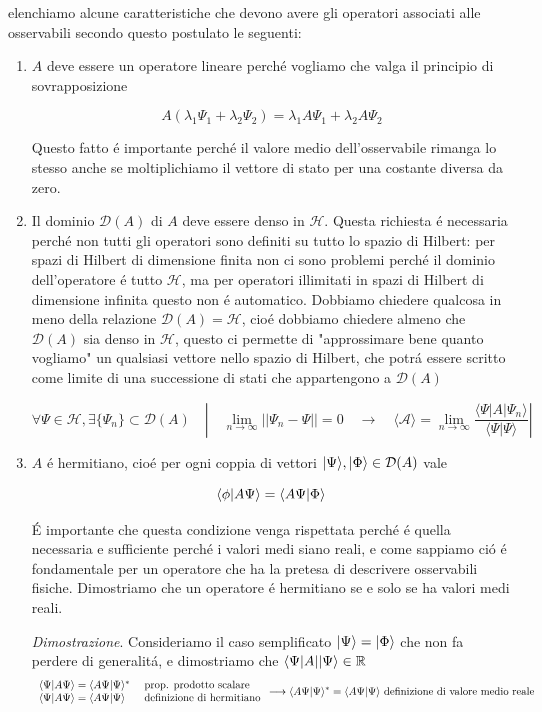 elenchiamo alcune caratteristiche che devono avere gli operatori associati alle osservabili secondo questo postulato le seguenti:
\begin{enumerate}
	\item $A$ deve essere un operatore lineare perch\'e vogliamo che valga il principio di sovrapposizione
	
	$$A(\lambda_{1}\Psi_{1}+\lambda_{2}\Psi_{2})=\lambda_{1}A\Psi_{1}+\lambda_{2}A\Psi_{2}$$
	
	Questo fatto \'e importante perch\'e il valore medio dell'osservabile rimanga lo stesso anche se moltiplichiamo il vettore di stato per una costante diversa da zero.
	
	\item Il dominio $\mathcal{D}(A)$ di $A$ deve essere denso in $\mathcal{H}$. Questa richiesta \'e necessaria perch\'e non tutti gli operatori sono definiti su tutto lo spazio di Hilbert: per spazi di Hilbert di dimensione finita non ci sono problemi perch\'e il dominio dell'operatore \'e tutto $\mathcal{H}$, ma per operatori illimitati in spazi di Hilbert di dimensione infinita questo non \'e automatico. Dobbiamo chiedere qualcosa in meno della relazione $\mathcal{D}(A) = \mathcal{H}$, cio\'e dobbiamo chiedere almeno che $\mathcal{D}(A)$ sia denso in $\mathcal{H}$, questo ci permette di "approssimare bene quanto vogliamo" un qualsiasi vettore nello spazio di Hilbert, che potr\'a essere scritto come limite di una successione di stati che appartengono a $\mathcal{D}(A)$
	
	$$\forall\Psi\in\mathcal{H},\exists\{\Psi_{n}\}\subset\mathcal{D}(A)\quad\left|\quad\lim_{n\to\infty}||\Psi_{n}-\Psi||=0\quad\longrightarrow\quad\langle\mathcal{A}\rangle=\lim_{n\to\infty}\frac{\langle\Psi|A|\Psi_{n}\rangle}{\langle\Psi|\Psi\rangle}\right|$$
	
	\item $A$ \'e hermitiano, cio\'e per ogni coppia di vettori $\ket{\Psi}, \ket{\Phi} \in \mathcal{D}(A)$ vale
	
	$$\braket{\phi}{A\Psi} = \braket{A\Psi}{\Phi}$$
	
	\'E importante che questa condizione venga rispettata perch\'e \'e quella necessaria e sufficiente perch\'e i valori medi siano reali, e come sappiamo ci\'o \'e fondamentale per un operatore che ha la pretesa di descrivere osservabili fisiche. Dimostriamo che un operatore \'e hermitiano se e solo se ha valori medi reali.
	
	
	\textit{Dimostrazione}. Consideriamo il caso semplificato $\ket{\Psi} = \ket{\Phi}$ che non fa perdere di generalit\'a, e dimostriamo che $\bra{\Psi|A}\ket{\Psi} \in \mathbb{R}$
	\begin{equation*}
		\begin{array}{l l}
			\braket{\Psi}{A\Psi} = \braket{A\Psi}{\Psi}^* & \text{ prop. prodotto scalare}
			\\
			\braket{\Psi}{A\Psi} = \braket{A\Psi}{\Psi} & \text{ definizione di hermitiano}
		\end{array}
		\longrightarrow \braket{A\Psi}{\Psi}^* = \braket{A\Psi}{\Psi} \text{ definizione di valore medio reale}
	\end{equation*}
	

\end{enumerate}
